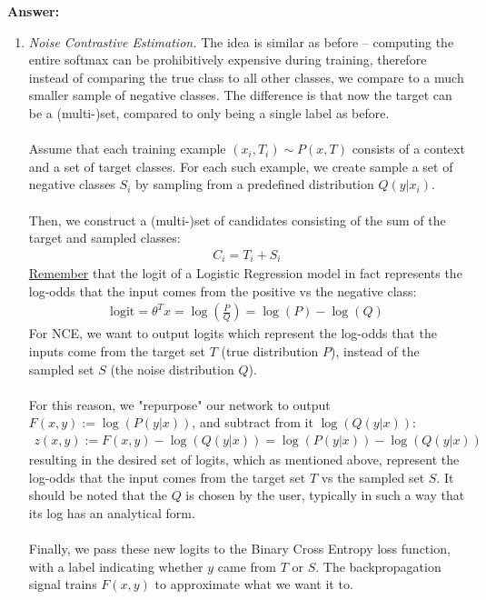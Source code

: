 \documentclass{article}
\newenvironment{QandA}{\begin{enumerate}[label=\arabic*.]}{\end{enumerate}}
\newenvironment{ListAlph}{\begin{enumerate}[label=(\alph*)]}{\end{enumerate}}
\newenvironment{answer}{\par\normalfont \textbf{Answer:}}{}
\newcommand{\g}{\vert}
\begin{document}
\begin{QandA}
\begin{answer}
\begin{ListAlph}
            \item \textit{Noise Contrastive Estimation.} The idea is similar as before -- computing the entire softmax can be prohibitively expensive during training, therefore instead of comparing the true class to all other classes, we compare to a much smaller sample of negative classes. The difference is that now the target can be a (multi-)set, compared to only being a single label as before.\\\\
            Assume that each training example $(x_i, T_i) \sim P(x, T)$ consists of a context and a set of target classes. For each such example, we create sample a set of negative classes $S_i$ by sampling from a predefined distribution $Q(y \g x_i)$. \\\\
            Then, we construct a (multi-)set of candidates consisting of the sum of the target and sampled classes:
            \begin{align*}
                C_i = T_i + S_i
            \end{align*}
            \href{https://math.stackexchange.com/a/4183626}{Remember} that the logit of a Logistic Regression model in fact represents the log-odds that the input comes from the positive vs the negative class:
            \begin{align*}
                \text{logit} = \theta^T x = \log \left(\frac{P}{Q} \right) = \log(P) - \log(Q)
            \end{align*}
            For NCE, we want to output logits which represent the log-odds that the inputs come from the target set $T$ (true distribution $P$), instead of the sampled set $S$ (the noise distribution $Q$). \\\\
            For this reason, we "repurpose" our network to output $F(x, y) := \log(P(y \g x))$, and subtract from it $\log(Q(y \g x))$:
            \begin{align*}
                z(x, y) := F(x, y) - \log(Q(y \g x)) = \log(P(y \g x)) - \log(Q(y \g x))
            \end{align*}
            resulting in the desired set of logits, which as mentioned above, represent the log-odds that the input comes from the target set $T$ vs the sampled set $S$. It should be noted that the $Q$ is chosen by the user, typically in such a way that its log has an analytical form. \\\\
            Finally, we pass these new logits to the Binary Cross Entropy loss function, with a label indicating whether $y$ came from $T$ or $S$. The backpropagation signal trains $F(x, y)$ to approximate what we want it to.


\end{ListAlph}
\end{answer}
\end{QandA}
\end{document}
